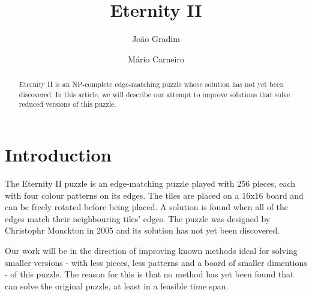 \documentclass{llncs}
\begin{document}
%
\frontmatter          %
%
\pagestyle{headings}  %
%

\mainmatter              %
%
\title{Eternity II}
%
%
\author{João Gradim \and Mário Carneiro}
%
%
%

\maketitle              %

\begin{abstract}
Eternity II is an NP-complete edge-matching puzzle whose solution has not yet been discovered. In this article, we will describe our attempt to improve solutions that solve reduced versions of this puzzle.
\end{abstract}
%
\section{Introduction}


The Eternity II puzzle is an edge-matching puzzle played with 256 pieces, each with four colour patterns on its edges. The tiles are placed on a 16x16 board and can be freely rotated before being placed. A solution is found when all of the edges match their neighbouring tiles' edges. The puzzle was designed by Christophr Monckton in 2005 and its solution has not yet been discovered.

Our work will be in the direction of improving known methods ideal for solving smaller versions - with less pieces, less patterns and a board of smaller dimentions - of this puzzle. The reason for this is that no method has yet been found that can solve the original puzzle, at least in a feasible time span.
\end{document}
